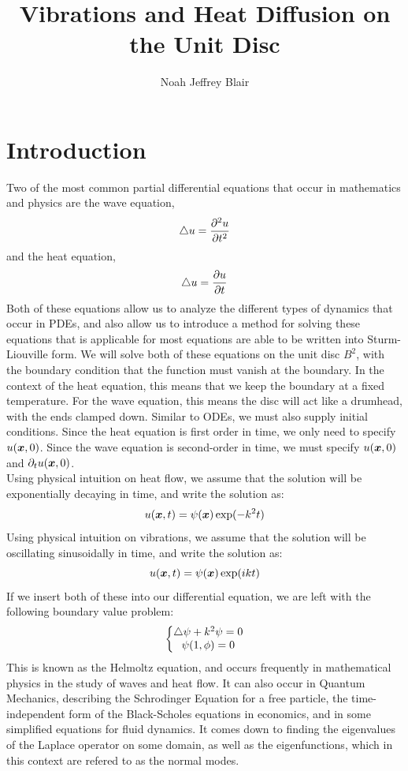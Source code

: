 \documentclass{paper}
\author{Noah Jeffrey Blair}
\title{Vibrations and Heat Diffusion on the Unit Disc}
\begin{document}
\maketitle
\tableofcontents
\section{Introduction}
Two of the most common partial differential equations that occur in mathematics and physics are the wave equation,
\begin{equation}
\bigtriangleup u=\frac{\partial ^2 u}{\partial t^2}
\end{equation}
and the heat equation,
\begin{equation}\bigtriangleup u=\frac{\partial u}{\partial t}\end{equation}
Both of these equations allow us to analyze the different types of dynamics that occur in PDEs, and also allow us to introduce a method for solving these equations that is applicable for most equations are able to be written into Sturm-Liouville form. We will solve both of these equations on the unit disc $B^2$, with the boundary condition that the function must vanish at the boundary. In the context of the heat equation, this means that we keep the boundary at a fixed temperature. For the wave equation, this means the disc will act like a drumhead, with the ends clamped down. Similar to ODEs, we must also supply initial conditions. Since the heat equation is first order in time, we only need to specify $u(\bm{x},0)$. Since the wave equation is second-order in time, we must specify $u(\bm{x},0)$ and $\partial_{t}u(\bm{x},0)$.\\
Using physical intuition on heat flow, we assume that the solution will be exponentially decaying in time, and write the solution as:
\begin{equation}u(\bm{x},t)=\psi(\bm{x})\exp(-k^2 t)\end{equation}
Using physical intuition on vibrations, we assume that the solution will be oscillating sinusoidally in time, and write the solution as:
\begin{equation}u(\bm{x},t)=\psi(\bm{x})\exp(i k t)\end{equation}
If we insert both of these into our differential equation, we are left with the following boundary value problem:
\begin{equation}\left\{\begin{matrix}
    \bigtriangleup\psi +k^2\psi=0 \\
    \psi(1,\phi)=0
 \end{matrix}\right.\end{equation}
This is known as the Helmoltz equation, and occurs frequently in mathematical physics in the study of waves and heat flow. It can also occur in Quantum Mechanics, describing the Schrodinger Equation for a free particle, the time-independent form of the Black-Scholes equations in economics, and in some simplified equations for fluid dynamics. It comes down to finding the eigenvalues of the Laplace operator on some domain, as well as the eigenfunctions, which in this context are refered to as the normal modes.
\end{document}
